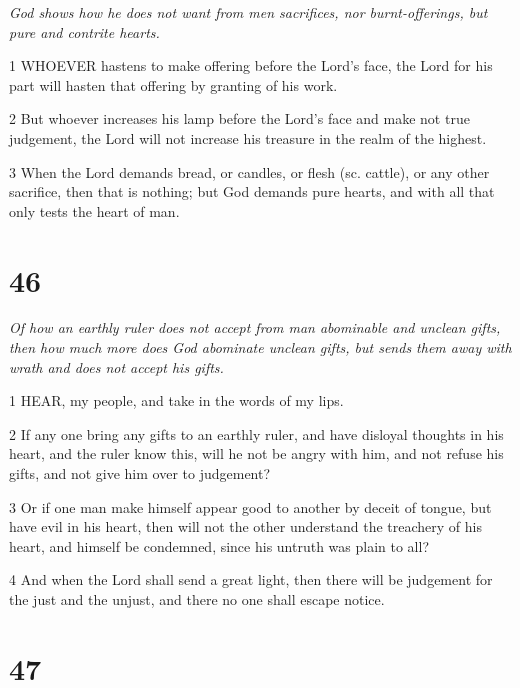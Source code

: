 \par \textit{God shows how he does not want from men sacrifices, nor burnt-offerings, but pure and contrite hearts.}

\par 1 WHOEVER hastens to make offering before the Lord's face, the Lord for his part will hasten that offering by granting of his work.

\par 2 But whoever increases his lamp before the Lord's face and make not true judgement, the Lord will not increase his treasure in the realm of the highest.

\par 3 When the Lord demands bread, or candles, or flesh (sc. cattle), or any other sacrifice, then that is nothing; but God demands pure hearts, and with all that only tests the heart of man.

\chapter{46}

\par \textit{Of how an earthly ruler does not accept from man abominable and unclean gifts, then how much more does God abominate unclean gifts, but sends them away with wrath and does not accept his gifts.}

\par 1 HEAR, my people, and take in the words of my lips.

\par 2 If any one bring any gifts to an earthly ruler, and have disloyal thoughts in his heart, and the ruler know this, will he not be angry with him, and not refuse his gifts, and not give him over to judgement?

\par 3 Or if one man make himself appear good to another by deceit of tongue, but have evil in his heart, then will not the other understand the treachery of his heart, and himself be condemned, since his untruth was plain to all?

\par 4 And when the Lord shall send a great light, then there will be judgement for the just and the unjust, and there no one shall escape notice.

\chapter{47}

